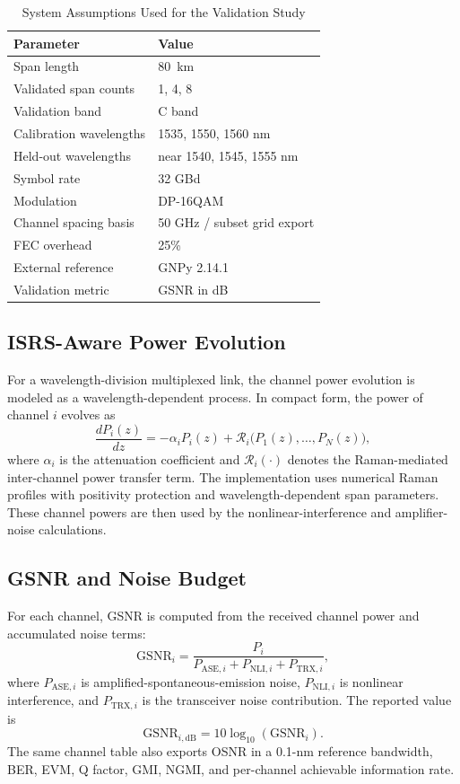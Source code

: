 \documentclass[conference]{IEEEtran}
\begin{document}
\begin{table}[!t]
\caption{System Assumptions Used for the Validation Study}
\label{tab:system}
\centering
\begin{tabular}{ll}
\toprule
Parameter & Value \\
\midrule
Span length & \SI{80}{km} \\
Validated span counts & 1, 4, 8 \\
Validation band & C band \\
Calibration wavelengths & 1535, 1550, 1560 nm \\
Held-out wavelengths & near 1540, 1545, 1555 nm \\
Symbol rate & 32 GBd \\
Modulation & DP-16QAM \\
Channel spacing basis & 50 GHz / subset grid export \\
FEC overhead & 25\% \\
External reference & GNPy 2.14.1 \\
Validation metric & GSNR in dB \\
\bottomrule
\end{tabular}
\end{table}

\subsection{ISRS-Aware Power Evolution}
For a wavelength-division multiplexed link, the channel power evolution is modeled as a wavelength-dependent process. In compact form, the power of channel $i$ evolves as
\begin{equation}
    \frac{dP_i(z)}{dz} = -\alpha_i P_i(z) + \mathcal{R}_i\big(P_1(z),\ldots,P_N(z)\big),
\end{equation}
where $\alpha_i$ is the attenuation coefficient and $\mathcal{R}_i(\cdot)$ denotes the Raman-mediated inter-channel power transfer term. The implementation uses numerical Raman profiles with positivity protection and wavelength-dependent span parameters. These channel powers are then used by the nonlinear-interference and amplifier-noise calculations.

\subsection{GSNR and Noise Budget}
For each channel, GSNR is computed from the received channel power and accumulated noise terms:
\begin{equation}
    \mathrm{GSNR}_i = \frac{P_i}{P_{\mathrm{ASE},i}+P_{\mathrm{NLI},i}+P_{\mathrm{TRX},i}},
\end{equation}
where $P_{\mathrm{ASE},i}$ is amplified-spontaneous-emission noise, $P_{\mathrm{NLI},i}$ is nonlinear interference, and $P_{\mathrm{TRX},i}$ is the transceiver noise contribution. The reported value is
\begin{equation}
    \mathrm{GSNR}_{i,\mathrm{dB}} = 10\log_{10}(\mathrm{GSNR}_i).
\end{equation}
The same channel table also exports OSNR in a 0.1-nm reference bandwidth, BER, EVM, Q factor, GMI, NGMI, and per-channel achievable information rate.
\end{document}
